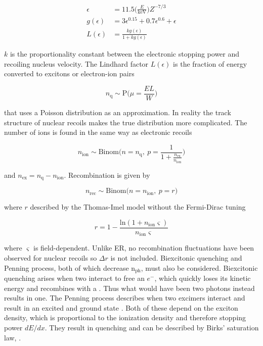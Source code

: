 \begin{subequations}
\begin{align}
\epsilon &= 11.5 \bigg( \frac{E}{\mathrm{keV}} \bigg) Z^{-7/3} \\
g( \epsilon ) &= 3 \epsilon ^{0.15} + 0.7 \epsilon ^{0.6} + \epsilon \\
L( \epsilon ) &= \frac{k g( \epsilon ) }{1 + k g( \epsilon )}
\end{align}
\label{eq:er_nr_calibrations_parameter_determ_nr_lindhard}
\end{subequations}

$k$ is the proportionality constant between the electronic stopping power and recoiling nucleus velocity.  The Lindhard factor
$L(\epsilon )$ is the fraction of energy converted to excitons or electron-ion pairs

\begin{equation}
n_{\mathrm{q}} \sim \mathrm{P} \bigg( \mu = \frac{E L}{W} \bigg)
\label{eq:er_nr_calibrations_parameter_determ_nr_quanta}
\end{equation}

\noindent that uses a Poisson distribution as an approximation.  In reality the track structure of nuclear recoils makes the true
distribution more complicated.  The number of ions is found in the same way as electronic recoils

\begin{equation}
n_{\mathrm{ion}} \sim \mathrm{Binom} \Bigg(n = n_{\mathrm{q}},\ p = \frac{1}{1 + \frac{n_{\mathrm{ex}}}{n_{\mathrm{ion}}}} \Bigg)
\end{equation}

\noindent and $n_{\mathrm{ex}} = n_{\mathrm{q}} - n_{\mathrm{ion}}$.  Recombination is given by

\begin{equation}
n_{\mathrm{rec}} \sim \mathrm{Binom} \big(n = n_{\mathrm{ion}},\ p = r \big)
\end{equation}

\noindent where $r$ described by the Thomas-Imel model without the Fermi-Dirac tuning

\begin{equation}
r = 1 - \frac{\mathrm{ln} (1 + n_{\mathrm{ion}} \varsigma)}{n_{\mathrm{ion}} \varsigma}
\end{equation}

\noindent where $\varsigma$ is field-dependent.  Unlike ER, no recombination fluctuations have been observed for nuclear recoils so
$\Delta r$ is not included.  Biexcitonic quenching and Penning process, both of which decrease
$\mathrm{n_{ph}}$, must also be considered.  Biexcitonic quenching arises when two
 interact to free an $e^-$, which quickly loses its kinetic energy
and recombines with a .  Thus what would have been two photons instead results in one.  The Penning process describes when
two excimers interact and result in an excited and ground state .  Both of these depend on the exciton density, which
is proportional to the ionization density and therefore stopping power $dE / dx$.  They result in quenching and can be
described by Birks' saturation law,  .

